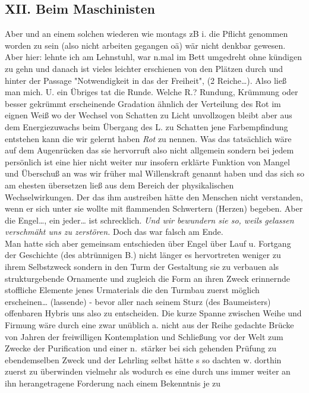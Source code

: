 \documentclass[
]{article}
\author{}
\date{\vspace{-2.5em}}
\begin{document}
\subsection{XII. Beim Maschinisten}\label{xii.-beim-maschinisten}

Aber und an einem solchen wiederen wie montags zB i. die Pflicht
genommen worden zu sein (also nicht arbeiten gegangen oä) wär nicht
denkbar gewesen. Aber hier: lehnte ich am Lehnstuhl, war n.mal im Bett
umgedreht ohne kündigen zu gehn und danach ist vieles leichter
erschienen von den Plätzen durch und hinter der Passage "Notwendigkeit
in das der Freiheit", (2 Reiche\ldots). Also ließ man mich. U. ein
Übriges tat die Runde. Welche R.? Rundung, Krümmung oder besser gekrümmt
erscheinende Gradation ähnlich der Verteilung des Rot im eignen Weiß wo
der Wechsel von Schatten zu Licht unvollzogen bleibt aber aus dem
Energiezuwachs beim Übergang des L. zu Schatten jene Farbempfindung
entstehen kann die wir gelernt haben \emph{Rot} zu nennen. Was das
tatsächlich wäre auf dem Augenrücken das sie hervorruft also nicht
allgemein sondern bei jedem persönlich ist eine hier nicht weiter nur
insofern erklärte Funktion von Mangel und Überschuß an was wir früher
mal Willenskraft genannt haben und das sich so am ehesten übersetzen
ließ aus dem Bereich der physikalischen Wechselwirkungen. Der das ihm
austreiben hätte den Menschen nicht verstanden, wenn er sich unter sie
wollte mit flammenden Schwertern (Herzen) begeben. Aber die Engel\ldots,
ein jeder\ldots{} ist schrecklich. \emph{Und wir bewundern sie so, weils
gelassen verschmäht uns zu zerstören. }Doch das war falsch am Ende.\\
Man hatte sich aber gemeinsam entschieden über Engel über Lauf u.
Fortgang der Geschichte (des abtrünnigen B.) nicht länger es
hervortreten weniger zu ihrem Selbstzweck sondern in den Turm der
Gestaltung sie zu verbauen als strukturgebende Ornamente und zugleich
die Form an ihren Zweck erinnernde stoffliche Elemente jenes Urmaterials
die den Turmbau zuerst möglich erscheinen\ldots{} (lassende) - bevor
aller nach seinem Sturz (des Baumeisters) offenbaren Hybris uns also zu
entscheiden. Die kurze Spanne zwischen Weihe und Firmung wäre durch eine
zwar unüblich a. nicht aus der Reihe gedachte Brücke von Jahren der
freiwilligen Kontemplation und Schließung vor der Welt zum Zwecke der
Purification und einer n.~stärker bei sich gehenden Prüfung zu
ebendemselben Zweck und der Lehrling selbst hätte s so dachten w.
dorthin zuerst zu überwinden vielmehr als wodurch es eine durch uns
immer weiter an ihn herangetragene Forderung nach einem Bekenntnis je zu
\end{document}
